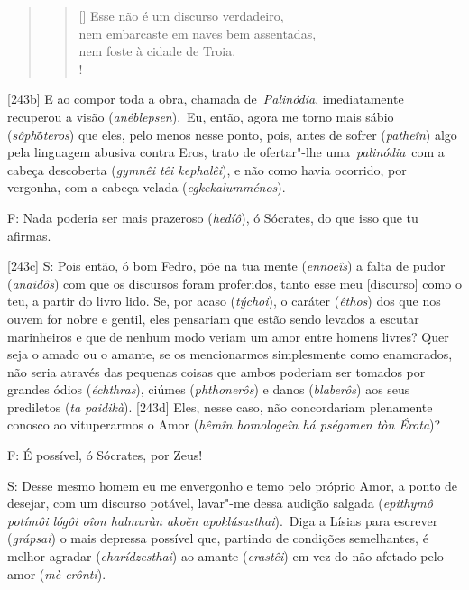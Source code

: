  

\begin{quote}

\begin{verse}[\versewidth]
Esse não é um discurso verdadeiro,\\
 nem embarcaste em naves bem
assentadas,\\
 nem foste à cidade de Troia.\\!
\end{verse} 
\end{quote}

 

[243b] E ao compor toda a obra, chamada de~\emph{Palinódia},
imediatamente recuperou a visão (\emph{anéblepsen}).~Eu, então, agora me
torno mais sábio (\emph{sôph}ṓ\emph{teros}) que eles, pelo menos nesse
ponto, pois, antes de sofrer (\emph{patheîn}) algo pela linguagem
abusiva contra Eros, trato de ofertar"-lhe uma~\emph{palinódia}~com a
cabeça descoberta (\emph{gymnêi têi kephalêi}), e não como havia
ocorrido, por vergonha, com a cabeça velada (\emph{egkekalumménos}).

 

F: Nada poderia ser mais prazeroso (\emph{hedíô}), ó Sócrates, do que
isso que tu afirmas.

 

[243c] S: Pois então, ó bom Fedro, põe na tua mente (\emph{ennoeîs})
a falta de pudor (\emph{anaidôs}) com que os discursos foram proferidos,
tanto esse meu [discurso] como o teu, a partir do livro lido. Se,
por acaso (\emph{týchoi}), o caráter (\emph{êthos}) dos que nos ouvem
for nobre e gentil, eles pensariam que estão sendo levados a escutar
marinheiros e que de nenhum modo veriam um amor entre homens livres?
Quer seja o amado ou o amante, se os mencionarmos simplesmente como
enamorados, não seria através das pequenas coisas que ambos poderiam ser
tomados por grandes ódios (\emph{échthras}), ciúmes (\emph{phthonerôs})
e danos (\emph{blaberôs}) aos seus prediletos (\emph{ta paidikà}).
[243d] Eles, nesse caso, não concordariam plenamente conosco ao
vituperarmos o Amor (\emph{hêmîn homologeîn há pségomen tòn Érota})?

 

F: É possível, ó Sócrates, por Zeus!

 

S: Desse mesmo homem eu me envergonho e temo pelo próprio Amor, a ponto
de desejar, com um discurso potável, lavar"-me dessa audição salgada
(\emph{epithymô potímôi lógôi oîon halmuràn akoḕn apoklúsasthai}).~Diga
a Lísias para escrever (\emph{grápsai}) o mais depressa possível que,
partindo de condições semelhantes, é melhor agradar
(\emph{charídzesthai}) ao amante (\emph{erastêi}) em vez do não afetado
pelo amor (\emph{mè erônti}).

